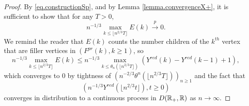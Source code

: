 \begin{proof}
By \eqref{eq.constructionSp}, and by Lemma \ref{lemma.convergenceX+}, it is sufficient to show that for any $T>0$,
$$n^{-1/3}\max_{k\leq \lfloor n^{2/3}T\rfloor}E(k)\overset{p}{\to}0.$$
We remind the reader that $E(k)$ counts the number children of the $k^{th}$ vertex that are filler vertices in $(F^{pr}(k),k\geq 1)$, so
$$n^{-1/3}\max_{k\leq \lfloor n^{2/3}T\rfloor}E(k)\leq n^{-1/3}\max_{k\leq \theta_n(\lfloor n^{2/3}T\rfloor)}(Y^{red}(k)-Y^{red}(k-1)+1),$$
which converges to $0$ by tightness of $\left(n^{-2/3}\theta^{n}(\lfloor n^{2/3}T\rfloor)\right)_{n\geq 1}$ and the fact that $$\left(n^{-1/3}Y^{red}\left(\lfloor n^{2/3}t\rfloor\right),t\geq 0\right)$$ converges in distribution to a continuous process in $D({\mathbb R}_+,{\mathbb R})$ as $n\to\infty$.
\end{proof}

